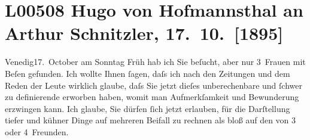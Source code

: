 

\section[Hugo von Hofmannsthal an Arthur Schnitzler, 17. 10. {[}1895{]}]{L00508 Hugo von Hofmannsthal an Arthur Schnitzler, 17. 10. {[}1895{]}}
\nopagebreak{}
\rehead{ }\normalsize\beginnumbering{}
\toendnotes[C]{\smallbreak\pagebreak[2]}
\toendnotes[C]{\smallbreak}
\pstart
           \raggedleft{}{\pb}Venedig17. October\pend
           \vspace{0.5em}
\pstart
           am Sonntag{ }Früh hab ich Sie beſucht, aber nur 3 Frauen mit Beſen gefunden. Ich
               wollte Ihnen ſagen, daſs ich nach den Zeitungen und dem Reden der Leute wirklich
               glaube, daſs Sie jetzt dieſes unberechenbare und ſchwer zu definierende erworben
               haben, womit man Aufmerkſamkeit und Bewunderung erzwingen kann. Ich glaube, Sie
               dürfen ſich jetzt erlauben, für die Darſtellung {\pb}tiefer und kühner Dinge auf
               mehreren Beifall zu rechnen als bloß auf den von 3 oder 4 Freunden.\pend
           
